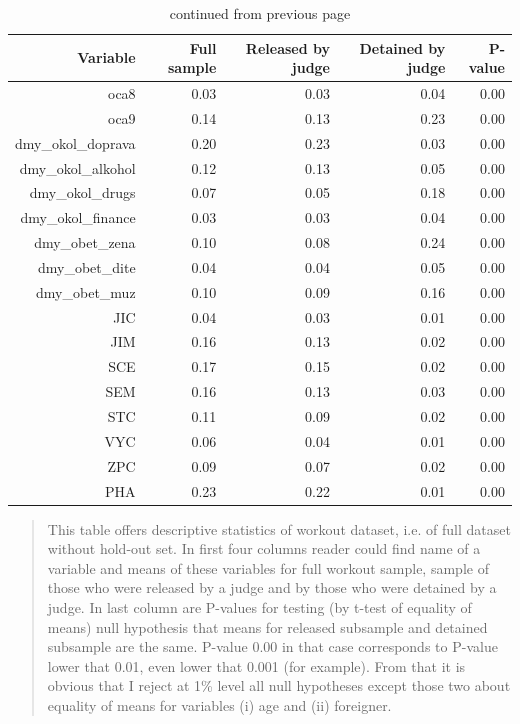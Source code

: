 \documentclass[12pt, twoside]{book} %
\begin{document}
\begin{table}[H]
\centering
\begin{tabular}{rrrrr}
  \hline
 Variable & Full sample & Released by judge & Detained by judge & P-value \\ 
  \hline
  oca8 & 0.03 & 0.03 & 0.04 & 0.00 \\ 
  oca9 & 0.14 & 0.13 & 0.23 & 0.00 \\ 
  dmy\_okol\_doprava & 0.20 & 0.23 & 0.03 & 0.00 \\ 
  dmy\_okol\_alkohol & 0.12 & 0.13 & 0.05 & 0.00 \\ 
  dmy\_okol\_drugs & 0.07 & 0.05 & 0.18 & 0.00 \\ 
  dmy\_okol\_finance & 0.03 & 0.03 & 0.04 & 0.00 \\ 
  dmy\_obet\_zena & 0.10 & 0.08 & 0.24 & 0.00 \\ 
  dmy\_obet\_dite & 0.04 & 0.04 & 0.05 & 0.00 \\ 
  dmy\_obet\_muz & 0.10 & 0.09 & 0.16 & 0.00 \\ 
  JIC & 0.04 & 0.03 & 0.01 & 0.00 \\ 
  JIM & 0.16 & 0.13 & 0.02 & 0.00 \\ 
  SCE & 0.17 & 0.15 & 0.02 & 0.00 \\ 
  SEM & 0.16 & 0.13 & 0.03 & 0.00 \\ 
  STC & 0.11 & 0.09 & 0.02 & 0.00 \\ 
  VYC & 0.06 & 0.04 & 0.01 & 0.00 \\ 
  ZPC & 0.09 & 0.07 & 0.02 & 0.00 \\ 
  PHA & 0.23 & 0.22 & 0.01 & 0.00 \\ 
   \hline
\end{tabular}

\renewcommand\thetable{2.3}
 \caption{continued from previous page}
\medskip
{\small 
\begin{quotation}
This table offers descriptive statistics of workout dataset, i.e. of full dataset without hold-out set. In first four columns reader could find name of a variable and means of these variables for full workout sample, sample of those who were released by a judge and by those who were detained by a judge. In last column are P-values for testing (by t-test of equality of means) null hypothesis that means for released subsample and detained subsample are the same. P-value 0.00 in that case corresponds to P-value lower that 0.01, even lower that 0.001 (for example). From that it is obvious that I reject at 1\% level all null hypotheses except those two about equality of means for variables (i) age and (ii) foreigner.
\end{quotation}
}

\end{table}
\end{document}
